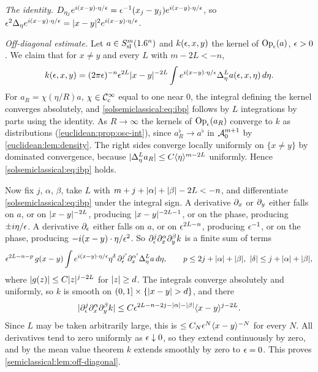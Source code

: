 \subsection*{}
\emph{The identity.} $D_{\eta_j}e^{i(x-y)\cdot\eta/\epsilon}=\epsilon^{-1}(x_j-y_j)e^{i(x-y)\cdot\eta/\epsilon}$, so
$\epsilon^2\Delta_\eta e^{i(x-y)\cdot\eta/\epsilon}=\lvert x-y\rvert^2e^{i(x-y)\cdot\eta/\epsilon}$.

\emph{Off-diagonal estimate.} Let $a\in S^{m}_{\mathrm{sl}}(1.6^n)$ and $k(\epsilon,x,y)$ the kernel of $\operatorname{Op}_\epsilon(a)$,
$\epsilon>0$. We claim that for $x\ne y$ and every $L$ with $m-2L<-n$,
\begin{equation}\label{solsemiclassical:eq:ibp}
k(\epsilon,x,y)=(2\pi\epsilon)^{-n}\epsilon^{2L}\lvert x-y\rvert^{-2L}\int e^{i(x-y)\cdot\eta/\epsilon}\Delta^L_\eta a(\epsilon,x,\eta)\,d\eta .
\end{equation}
For $a_R=\chi(\eta/R)a$, $\chi\in\mathcal{C}^\infty_{\mathrm{c}}$ equal to one near $0$, the integral defining the kernel converges
absolutely, and \eqref{solsemiclassical:eq:ibp} follows by $L$ integrations by parts using the
identity. As $R\to\infty$ the kernels of $\operatorname{Op}_\epsilon(a_R)$ converge to $k$ as distributions
(\cref{euclidean:prop:osc-int}), since $a_R^\flat\to a^\flat$ in $\mathcal{A}^{m+1}_{0}$ by
\cref{euclidean:lem:density}. The right sides converge locally uniformly on $\{x\ne y\}$ by
dominated convergence, because $\lvert \Delta^L_\eta a_R\rvert\le C\langle \eta\rangle^{m-2L}$ uniformly. Hence
\eqref{solsemiclassical:eq:ibp} holds.

Now fix $j$, $\alpha$, $\beta$, take $L$ with $m+j+\lvert \alpha\rvert+\lvert \beta\rvert-2L<-n$, and differentiate
\eqref{solsemiclassical:eq:ibp} under the integral sign. A derivative $\partial_x$ or $\partial_y$ either
falls on $a$, or on $\lvert x-y\rvert^{-2L}$, producing $\lvert x-y\rvert^{-2L-1}$, or on the phase, producing
$\pm i\eta/\epsilon$. A derivative $\partial_\epsilon$ either falls on $a$, or on $\epsilon^{2L-n}$, producing $\epsilon^{-1}$, or
on the phase, producing $-i(x-y)\cdot\eta/\epsilon^2$. So $\partial^j_\epsilon\partial^\alpha_x\partial^\beta_yk$ is a finite sum of
terms
\begin{equation*}
\epsilon^{2L-n-p}\,g(x-y)\int e^{i(x-y)\cdot\eta/\epsilon}\eta^\delta\,\partial^{j'}_\epsilon\partial^{\alpha'}_x\Delta^L_\eta a\,d\eta,\qquad
p\le2j+\lvert \alpha\rvert+\lvert \beta\rvert,\ \lvert \delta\rvert\le j+\lvert \alpha\rvert+\lvert \beta\rvert,
\end{equation*}
where $\lvert g(z)\rvert\le C\lvert z\rvert^{j-2L}$ for $\lvert z\rvert\ge d$. The integrals converge absolutely and uniformly,
so $k$ is smooth on $(0,1]\times\{\lvert x-y\rvert>d\}$, and there
\begin{equation*}
\lvert \partial^j_\epsilon\partial^\alpha_x\partial^\beta_yk\rvert\le C\epsilon^{2L-n-2j-\lvert \alpha\rvert-\lvert \beta\rvert}\langle x-y\rangle^{j-2L}.
\end{equation*}
Since $L$ may be taken arbitrarily large, this is $\le C_N\epsilon^N\langle x-y\rangle^{-N}$ for every $N$. All derivatives
tend to zero uniformly as $\epsilon\downarrow0$, so they extend continuously by zero, and by the mean
value theorem $k$ extends smoothly by zero to $\epsilon=0$. This proves
\cref{semiclassical:lem:off-diagonal}.

